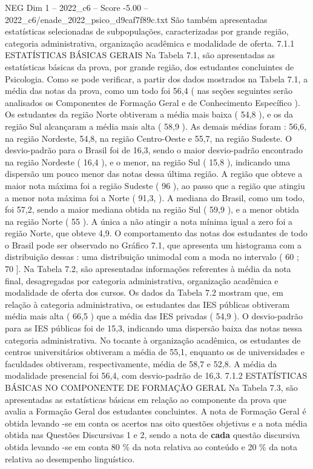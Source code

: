 \begin{textsample}{NEG Dim 1 – 2022\_c6 – Score -5.00 – 2022\_c6/enade\_2022\_psico\_d9caf7f89c.txt}
São também apresentadas estatísticas selecionadas de subpopulações, caracterizadas por grande região, categoria administrativa, organização acadêmica e modalidade de oferta. 7.1.1 ESTATÍSTICAS BÁSICAS GERAIS Na Tabela 7.1, são apresentadas as estatísticas básicas da prova, por grande região, dos estudantes concluintes de Psicologia.
Como se pode verificar, a partir dos dados mostrados na Tabela 7.1, a média das notas da prova, como um todo foi 56,4 ( nas seções seguintes serão analisados os Componentes de Formação Geral e de Conhecimento Específico ).
Os estudantes da região Norte obtiveram a média mais baixa ( 54,8 ), e os da região Sul alcançaram a média mais alta ( 58,9 ).
As demais médias foram : 56,6, na região Nordeste, 54,8, na região Centro-Oeste e 55,7, na região Sudeste.
O desvio-padrão para o Brasil foi de 16,3, sendo o maior desvio-padrão encontrado na região Nordeste ( 16,4 ), e o menor, na região Sul ( 15,8 ), indicando uma dispersão um pouco menor das notas dessa última região.
A região que obteve a maior nota máxima foi a região Sudeste ( 96 ), ao passo que a região que atingiu a menor nota máxima foi a Norte ( 91,3, ).
A mediana do Brasil, como um todo, foi 57,2, sendo a maior mediana obtida na região Sul ( 59,9 ), e a menor obtida na região Norte ( 55 ).
A única a não atingir a nota mínima igual a zero foi a região Norte, que obteve 4,9.
O comportamento das notas dos estudantes de todo o Brasil pode ser observado no Gráfico 7.1, que apresenta um histograma com a distribuição dessas : uma distribuição unimodal com a moda no intervalo ( 60 ; 70 ].
Na Tabela 7.2, são apresentadas informações referentes à média da nota final, desagregadas por categoria administrativa, organização acadêmica e modalidade de oferta dos cursos.
Os dados da Tabela 7.2 mostram que, em relação à categoria administrativa, os estudantes das IES públicas obtiveram média mais alta ( 66,5 ) que a média das IES privadas ( 54,9 ).
O desvio-padrão para as IES públicas foi de 15,3, indicando uma dispersão baixa das notas nessa categoria administrativa.
No tocante à organização acadêmica, os estudantes de centros universitários obtiveram a média de 55,1, enquanto os de universidades e faculdades obtiveram, respectivamente, média de 58,7 e 52,8.
A média da modalidade presencial foi 56,4, com desvio-padrão de 16,3. 7.1.2 ESTATÍSTICAS BÁSICAS NO COMPONENTE DE FORMAÇÃO GERAL Na Tabela 7.3, são apresentadas as estatísticas básicas em relação ao componente da prova que avalia a Formação Geral dos estudantes concluintes.
A nota de Formação Geral é obtida levando -se em conta os acertos nas oito questões objetivas e a nota média obtida nas Questões Discursivas 1 e 2, sendo a nota de \textbf{cada} questão discursiva obtida levando -se em conta 80 \% da nota relativa ao conteúdo e 20 \% da nota relativa ao desempenho linguístico.

\end{textsample}
